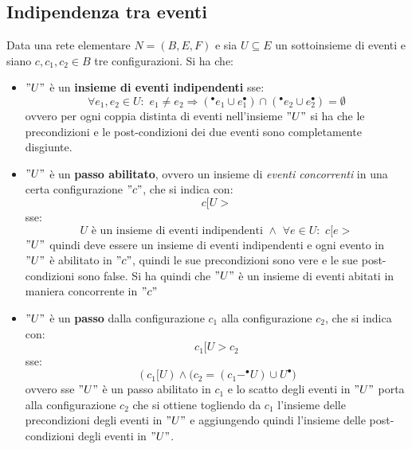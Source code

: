 \subsection{Indipendenza tra eventi}
\begin{definizione}
  Data una rete elementare $N=(B, E, F)$ e sia $U \subseteq E$ un sottoinsieme di
  eventi e siano $c, c_1, c_2\in B$ tre configurazioni. Si ha che:
  \begin{itemize}
    \item $"U"$ è un \textbf{insieme di eventi indipendenti} sse:
    \[\forall e_1, e_2\in U:\,\, e_1\neq e_2\Rightarrow (^\bullet e_1\cup
      e_1^\bullet)\cap  (^\bullet e_2\cup e_2^\bullet) = \emptyset\]
    ovvero per ogni coppia distinta di eventi nell'insieme $"U"$ si ha che le
    precondizioni e le post-condizioni dei due eventi sono completamente
    disgiunte.
    \item $"U"$ è un \textbf{passo abilitato}, ovvero un insieme di \textit{eventi
      concorrenti} in una certa configurazione $"c"$, che si indica con:
    \[c[U>\]
    sse:
    \[U \mbox{ è un insieme di eventi indipendenti } \wedge\,\, \forall e\in
      U:\,\, c[e>\]
    $"U"$ quindi deve essere un insieme di eventi indipendenti e ogni evento in
    $"U"$ è abilitato in $"c"$, quindi le sue precondizioni sono vere e le sue
    post-condizioni sono false. Si ha quindi che $"U"$ è un insieme di eventi
    abitati in maniera concorrente in $"c"$
    \item $"U"$ è un \textbf{passo} dalla configurazione $c_1$ alla configurazione
    $c_2$, che si indica con:
    \[c_1[U > c_2\]
    sse:
    \[(c_1[U) \wedge \Big(c_2=(c_1-^\bullet U)\cup U^\bullet\Big)\]
    ovvero sse $"U"$ è un passo abilitato in $c_1$ e lo scatto degli eventi in $"U"$
    porta alla configurazione $c_2$ che si ottiene togliendo da $c_1$ l'insieme
    delle precondizioni degli eventi in $"U"$ e aggiungendo quindi l'insieme delle
    post-condizioni degli eventi in $"U"$.
  \end{itemize}
\end{definizione} \vspace{5mm} %
